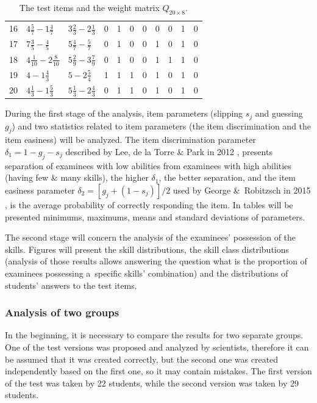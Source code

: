 \documentclass[english]{pwr_wmat_praca_dyplomowa}
\theoremstyle{plain}
\numberwithin{theorem}{chapter}
\theoremstyle{definition}
\numberwithin{theorem}{chapter}
\begin{document}
\begin{table}[ht]
\begin{tabular}{l l l c c c c c c c c}
			16 & $4\frac{5}{7} - 1\frac{4}{7}$ & $3\frac{2}{3} - 2\frac{1}{3}$ & 0 & 1 & 0 & 0 & 0 & 0 & 1 & 0 \\ [1ex]
			17 & $7\frac{3}{5} - \frac{4}{5}$ & $5\frac{4}{7} - \frac{5}{7}$ & 0 & 1 & 0 & 0 & 1 & 0 & 1 & 0 \\ [1ex]
			18 & $4\frac{1}{10} - 2\frac{8}{10}$ & $5\frac{2}{9} - 3\frac{7}{9}$ & 0 & 1 & 0 & 0 & 1 & 1 & 1 & 0 \\ [1ex]
			19 & $4 - 1\frac{4}{3}$ & $5 - 2\frac{5}{4}$ & 1 & 1 & 1 & 0 & 1 & 0 & 1 & 0 \\ [1ex]
			20 & $4\frac{1}{3} - 1\frac{5}{3}$ & $5\frac{1}{3} - 2\frac{4}{3}$ & 0 & 1 & 1 & 0 & 1 & 0 & 1 &0\\[0.5ex] 
			\hline
		\end{tabular}
		\caption{The test items and the weight matrix $Q_{20 \times 8}$.}
		\label{tab:qmatrix_real} 
	\end{table}
	
	During the first stage of the analysis, item parameters (slipping $s_j$ and guessing $g_j$) and two statistics related to item parameters (the item discrimination and the item easiness) will be analyzed. The item discrimination parameter $\delta_1 = 1 - g_j - s_j$ described by Lee, de la Torre \& Park in 2012 \cite{item_discrimination}, presents separation of examinees with low abilities from examinees with high abilities (having few \& many skills), the higher $\delta_1$, the better separation, and the item easiness parameter $\delta_2 = [g_j + (1-s_j)]/2$ used by George \&~Robitzsch in 2015 \cite{cdm_in_r}, is the average probability of correctly responding the item. In tables will be presented minimums, maximums, means and standard deviations of parameters. 
	
	The second stage will concern the analysis of the examinees' possession of the skills. Figures will present the skill distributions, the skill class distributions (analysis of those results allows answering the question what is the proportion of examinees possessing a~specific skills' combination) and the distributions of students' answers to the test items. 
	
	\subsubsection{Analysis of two groups}
	
	In the beginning, it is necessary to compare the results for two separate groups. One of the test versions was proposed and analyzed by scientists, therefore it can be assumed that it was created correctly, but the second one was created independently based on the first one, so it may contain mistakes. The first version of the test was taken by 22 students, while the second version was taken by 29 students. 
	
\end{document}
